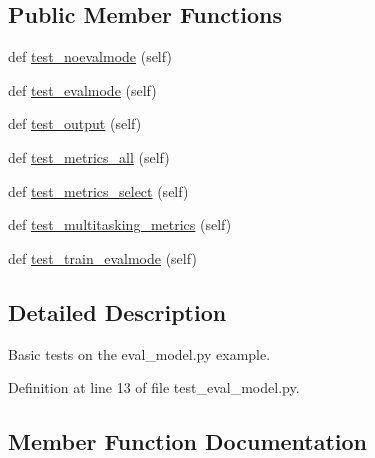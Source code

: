 \subsection*{Public Member Functions}
\begin{DoxyCompactItemize}
\item 
def \hyperlink{classtests_1_1test__eval__model_1_1TestEvalModel_a9dcbb770a097fa51f6162fe85c8cd1c5}{test\+\_\+noevalmode} (self)
\item 
def \hyperlink{classtests_1_1test__eval__model_1_1TestEvalModel_a23e0698c9a27e596401f00f914b6a27f}{test\+\_\+evalmode} (self)
\item 
def \hyperlink{classtests_1_1test__eval__model_1_1TestEvalModel_a899d6a41fb8f56be62a7145d9937ee52}{test\+\_\+output} (self)
\item 
def \hyperlink{classtests_1_1test__eval__model_1_1TestEvalModel_a35d01001a5c2f289c98b384e1a53e515}{test\+\_\+metrics\+\_\+all} (self)
\item 
def \hyperlink{classtests_1_1test__eval__model_1_1TestEvalModel_a7b7b27f681704f217f711b04311977c2}{test\+\_\+metrics\+\_\+select} (self)
\item 
def \hyperlink{classtests_1_1test__eval__model_1_1TestEvalModel_a06987267bf1d5f021f3ddcbe489a820f}{test\+\_\+multitasking\+\_\+metrics} (self)
\item 
def \hyperlink{classtests_1_1test__eval__model_1_1TestEvalModel_a6f8c8d67ca1f6a036122e191fdc77c26}{test\+\_\+train\+\_\+evalmode} (self)
\end{DoxyCompactItemize}


\subsection{Detailed Description}
\begin{DoxyVerb}Basic tests on the eval_model.py example.
\end{DoxyVerb}
 

Definition at line 13 of file test\+\_\+eval\+\_\+model.\+py.



\subsection{Member Function Documentation}
\mbox{\label{classtests_1_1test__eval__model_1_1TestEvalModel_a23e0698c9a27e596401f00f914b6a27f}} 

